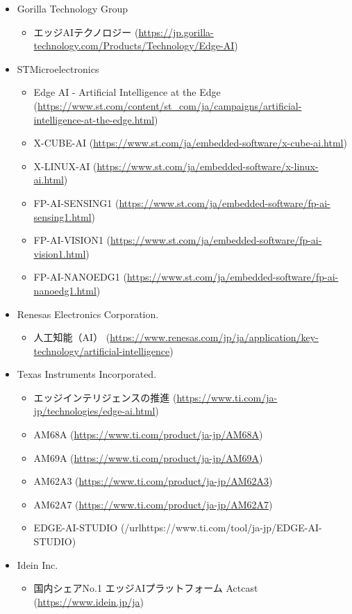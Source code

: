 \begin{itemize}
\begin{itemize}
\begin{itemize}
		\end{itemize}
		\item Gorilla Technology Group
		\begin{itemize}
			\item エッジAIテクノロジー (\url{https://jp.gorilla-technology.com/Products/Technology/Edge-AI})
		\end{itemize}
		\item STMicroelectronics
		\begin{itemize}
			\item Edge AI - Artificial Intelligence at the Edge (\url{https://www.st.com/content/st_com/ja/campaigns/artificial-intelligence-at-the-edge.html})
			\item X-CUBE-AI (\url{https://www.st.com/ja/embedded-software/x-cube-ai.html})
			\item X-LINUX-AI (\url{https://www.st.com/ja/embedded-software/x-linux-ai.html})
			\item FP-AI-SENSING1 (\url{https://www.st.com/ja/embedded-software/fp-ai-sensing1.html})
			\item FP-AI-VISION1 (\url{https://www.st.com/ja/embedded-software/fp-ai-vision1.html})
			\item FP-AI-NANOEDG1 (\url{https://www.st.com/ja/embedded-software/fp-ai-nanoedg1.html})
		\end{itemize}
		\item Renesas Electronics Corporation.
		\begin{itemize}
			\item 人工知能（AI） (\url{https://www.renesas.com/jp/ja/application/key-technology/artificial-intelligence})
		\end{itemize}
		\item Texas Instruments Incorporated.
		\begin{itemize}
			\item エッジインテリジェンスの推進 (\url{https://www.ti.com/ja-jp/technologies/edge-ai.html})
			\item AM68A (\url{https://www.ti.com/product/ja-jp/AM68A})
			\item AM69A (\url{https://www.ti.com/product/ja-jp/AM69A})
			\item AM62A3 (\url{https://www.ti.com/product/ja-jp/AM62A3})
			\item AM62A7 (\url{https://www.ti.com/product/ja-jp/AM62A7})
			\item EDGE-AI-STUDIO (/url{https://www.ti.com/tool/ja-jp/EDGE-AI-STUDIO})
		\end{itemize}
		\item Idein Inc.
		\begin{itemize}
			\item 国内シェアNo.1 エッジAIプラットフォーム Actcast (\url{https://www.idein.jp/ja})
		\end{itemize}
	\end{itemize}
\end{itemize}


